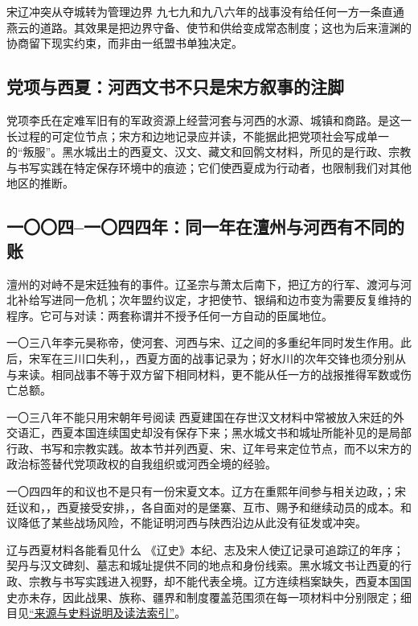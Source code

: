 \begin{turningpoint}{宋辽冲突从夺城转为管理边界}
九七九和九八六年的战事没有给任何一方一条直通燕云的道路。其效果是把边界守备、使节和供给变成常态制度；这也为后来澶渊的协商留下现实约束，而非由一纸盟书单独决定。
\end{turningpoint}

\subsection{党项与西夏：河西文书不只是宋方叙事的注脚}
党项李氏在定难军旧有的军政资源上经营河套与河西的水源、城镇和商路。是这一长过程的可定位节点；宋方和边地记录应并读，不能据此把党项社会写成单一的“叛服”。黑水城出土的西夏文、汉文、藏文和回鹘文材料，所见的是行政、宗教与书写实践在特定保存环境中的痕迹；它们使西夏成为行动者，也限制我们对其他地区的推断。

\subsection{一〇〇四--一〇四四年：同一年在澶州与河西有不同的账}
澶州的对峙不是宋廷独有的事件。辽圣宗与萧太后南下，把辽方的行军、渡河与河北补给写进同一危机；次年盟约议定，才把使节、银绢和边市变为需要反复维持的程序。它可与对读：两套称谓并不授予任何一方自动的臣属地位。

一〇三八年李元昊称帝，使河套、河西与宋、辽之间的多重纪年同时发生作用。此后，宋军在三川口失利，，西夏方面的战事记录为；好水川的次年交锋也须分别从与来读。相同战事不等于双方留下相同材料，更不能从任一方的战报推得军数或伤亡总额。

\begin{sourcenote}{一〇三八年不能只用宋朝年号阅读}
西夏建国在存世汉文材料中常被放入宋廷的外交语汇，西夏本国连续国史却没有保存下来；黑水城文书和城址所能补见的是局部行政、书写和宗教实践。故本节并列西夏、宋、辽年号来定位节点，而不以宋方的政治标签替代党项政权的自我组织或河西全境的经验。
\end{sourcenote}

一〇四四年的和议也不是只有一份宋夏文本。辽方在重熙年间参与相关边政，；宋廷议和，，西夏接受安排，，各自面对的是堡寨、互市、赐予和继续动员的成本。和议降低了某些战场风险，不能证明河西与陕西沿边从此没有征发或冲突。

\begin{sourcenote}{辽与西夏材料各能看见什么}
《辽史》本纪、志及宋人使辽记录可追踪辽的年序；契丹与汉文碑刻、墓志和城址提供不同的地点和身份线索。黑水城文书让西夏的行政、宗教与书写实践进入视野，却不能代表全境。辽方连续档案缺失，西夏本国国史亦未存，因此战果、族称、疆界和制度覆盖范围须在每一项材料中分别限定；细目见\hyperref[app:sources]{“来源与史料说明及读法索引”}。
\end{sourcenote}
